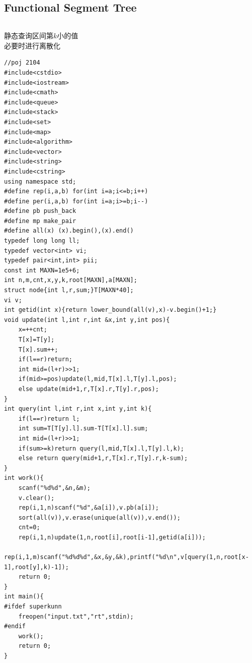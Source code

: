 \documentclass[twoside]{article}
\begin{document}
\subsection{Functional Segment Tree}
\begin{lstlisting}
\end{lstlisting}
静态查询区间第$k$小的值\\
必要时进行离散化
\begin{lstlisting}
//poj 2104
#include<cstdio>
#include<iostream>
#include<cmath>
#include<queue>
#include<stack>
#include<set>
#include<map>
#include<algorithm>
#include<vector>
#include<string>
#include<cstring>
using namespace std;
#define rep(i,a,b) for(int i=a;i<=b;i++)
#define per(i,a,b) for(int i=a;i>=b;i--)
#define pb push_back
#define mp make_pair
#define all(x) (x).begin(),(x).end()
typedef long long ll;
typedef vector<int> vi;
typedef pair<int,int> pii;
const int MAXN=1e5+6;
int n,m,cnt,x,y,k,root[MAXN],a[MAXN];
struct node{int l,r,sum;}T[MAXN*40];
vi v;
int getid(int x){return lower_bound(all(v),x)-v.begin()+1;}
void update(int l,int r,int &x,int y,int pos){
    x=++cnt;
    T[x]=T[y];
    T[x].sum++;
    if(l==r)return;
    int mid=(l+r)>>1;
    if(mid>=pos)update(l,mid,T[x].l,T[y].l,pos);
    else update(mid+1,r,T[x].r,T[y].r,pos);
}
int query(int l,int r,int x,int y,int k){
    if(l==r)return l;
    int sum=T[T[y].l].sum-T[T[x].l].sum;
    int mid=(l+r)>>1;
    if(sum>=k)return query(l,mid,T[x].l,T[y].l,k);
    else return query(mid+1,r,T[x].r,T[y].r,k-sum);
}
int work(){
    scanf("%d%d",&n,&m);
    v.clear();
    rep(i,1,n)scanf("%d",&a[i]),v.pb(a[i]);
    sort(all(v)),v.erase(unique(all(v)),v.end());
    cnt=0;
    rep(i,1,n)update(1,n,root[i],root[i-1],getid(a[i]));
    rep(i,1,m)scanf("%d%d%d",&x,&y,&k),printf("%d\n",v[query(1,n,root[x-1],root[y],k)-1]);
    return 0;
}
int main(){
#ifdef superkunn
    freopen("input.txt","rt",stdin);
#endif
    work();
    return 0;
}
\end{lstlisting}
\end{document}
